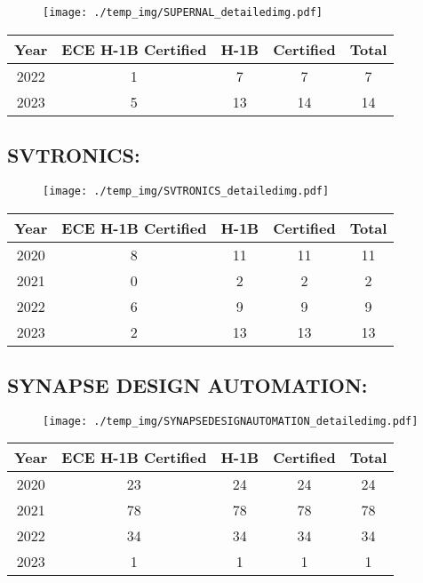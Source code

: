 \documentclass{article}%
\begin{document}
\begin{figure}[htbp]%
\centering%
\texttt{[image: ./temp\_img/SUPERNAL\_detailedimg.pdf]}%
\end{figure}

%
\begin{longtable}{c|c|c|c|c}%
\hline%
Year&ECE H{-}1B Certified&H{-}1B&Certified&Total\\%
\hline%
2022&1&7&7&7\\%
\hline%
2023&5&13&14&14\\%
\hline%
\end{longtable}

%
\newpage%
\subsection{SVTRONICS:}%
\label{subsec:SVTRONICS}%
\label{SVTRONICSdetailed}%


\begin{figure}[htbp]%
\centering%
\texttt{[image: ./temp\_img/SVTRONICS\_detailedimg.pdf]}%
\end{figure}

%
\begin{longtable}{c|c|c|c|c}%
\hline%
Year&ECE H{-}1B Certified&H{-}1B&Certified&Total\\%
\hline%
2020&8&11&11&11\\%
\hline%
2021&0&2&2&2\\%
\hline%
2022&6&9&9&9\\%
\hline%
2023&2&13&13&13\\%
\hline%
\end{longtable}

%
\newpage%
\subsection{SYNAPSE DESIGN AUTOMATION:}%
\label{subsec:SYNAPSEDESIGNAUTOMATION}%
\label{SYNAPSEDESIGNAUTOMATIONdetailed}%


\begin{figure}[htbp]%
\centering%
\texttt{[image: ./temp\_img/SYNAPSEDESIGNAUTOMATION\_detailedimg.pdf]}%
\end{figure}

%
\begin{longtable}{c|c|c|c|c}%
\hline%
Year&ECE H{-}1B Certified&H{-}1B&Certified&Total\\%
\hline%
2020&23&24&24&24\\%
\hline%
2021&78&78&78&78\\%
\hline%
2022&34&34&34&34\\%
\hline%
2023&1&1&1&1\\%
\hline%
\end{longtable}
\end{document}
